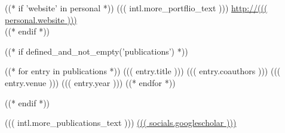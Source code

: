 \documentclass[
	a4paper,
	sidebarwidth=0.33\paperwidth,
	profilepicstyle=profilecircle,
]{fortysecondscv}
\begin{document}
((* if 'website' in personal *))
{
	\scriptsize \color{gray}
	((( intl.more_portflio_text ))) \href{http://((( personal.website )))}{http://((( personal.website )))}\\
}
((* endif *))

((* if defined_and_not_empty('publications') *))
\begin{cvtable}
	((* for entry in publications *))
		\cvpubitem
			{((( entry.title )))}
			{((( entry.coauthors )))}
			{((( entry.venue )))}
			{((( entry.year )))}
	((* endfor *))
\end{cvtable}
((* endif *))

{
	\scriptsize \color{gray}
	((( intl.more_publications_text ))) \href{((( socials.googlescholar )))}{((( socials.googlescholar )))}\\
}
\end{document}
